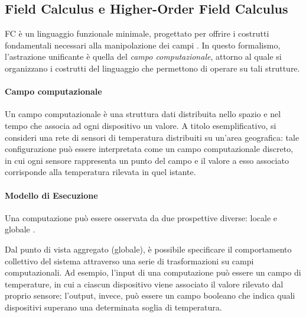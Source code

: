 \subsection{Field Calculus e Higher-Order Field Calculus}
\label{sec:fieldcalculus}

\ac{FC} è un linguaggio funzionale minimale, progettato per offrire i costrutti fondamentali necessari alla manipolazione dei campi \cite{HFC}. In questo formalismo, l'astrazione unificante è quella del \textit{campo computazionale}, attorno al quale si organizzano i costrutti del linguaggio che permettono di operare su tali strutture.

\paragraph{Campo computazionale \label{campo}} Un campo computazionale è una struttura dati distribuita nello spazio e nel tempo che associa ad ogni dispositivo un valore.
%
A titolo esemplificativo, si consideri una rete di sensori di temperatura distribuiti su un'area geografica: tale configurazione può essere interpretata come un campo computazionale discreto, in cui ogni sensore rappresenta un punto del campo e il valore a esso associato corrisponde alla temperatura rilevata in quel istante.

\paragraph{Modello di Esecuzione} Una computazione può essere osservata da due prospettive diverse: locale e globale \cite{HFC}.

Dal punto di vista aggregato (globale), è possibile specificare il comportamento collettivo del sistema attraverso una serie di trasformazioni su campi computazionali.
%
Ad esempio, l’input di una computazione può essere un campo di temperature, in cui a ciascun dispositivo viene associato il valore rilevato dal proprio sensore; l’output, invece, può essere un campo booleano che indica quali dispositivi superano una determinata soglia di temperatura.

